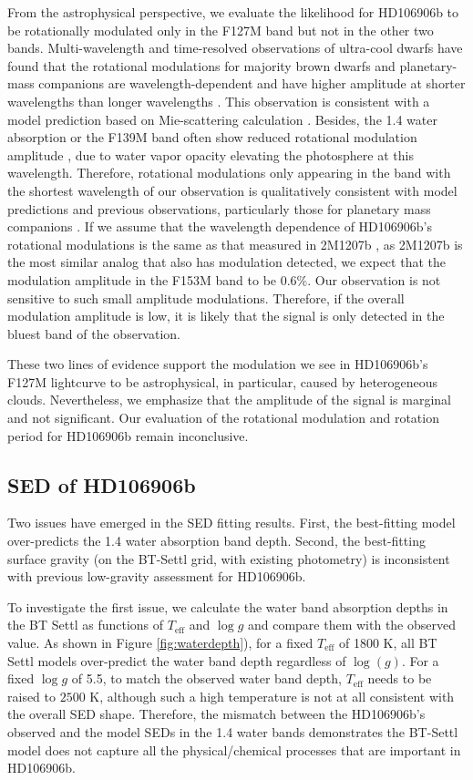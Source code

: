 \documentclass[twocolumn]{aastex62}
\newcommand{\logg}{\ensuremath{\log(g)}\xspace}
\begin{document}
From the astrophysical perspective, we evaluate the likelihood for HD106906b to be rotationally modulated only in the F127M band but not in the other two bands. Multi-wavelength and time-resolved observations of ultra-cool dwarfs have found that the rotational modulations for majority  brown dwarfs and planetary-mass companions are wavelength-dependent and have higher amplitude at shorter wavelengths than longer wavelengths \citep[e.g.,][]{Zhou2019,Zhou2016,Yang2014,Apai2013,Schlawin}. This observation is consistent with a model prediction based on Mie-scattering calculation \citep{Schlawin,Hiranaka2016}. Besides, the 1.4 \micron{} water absorption or the F139M band often show reduced rotational modulation amplitude \citep[e.g.,][]{Apai2013}, due to water vapor opacity elevating the photosphere at this wavelength.  Therefore, rotational modulations only appearing in the band with the shortest wavelength of our observation is qualitatively consistent with model predictions and previous observations, particularly those for planetary mass companions \citep{Zhou2016,Zhou2019}. If we assume that the wavelength dependence of HD106906b's rotational modulations is the same as that measured in 2M1207b \citep{Zhou2016}, as 2M1207b is the most similar analog that also has modulation detected, we expect that the modulation amplitude in the F153M band to be 0.6\%. Our observation is not sensitive to such small amplitude modulations. Therefore, if the overall modulation amplitude is low, it is likely that the signal is only detected in the bluest band of the observation.

These two lines of evidence support the modulation we see in HD106906b's F127M lightcurve to be astrophysical, in particular, caused by heterogeneous clouds. Nevertheless, we emphasize that the amplitude of the signal is marginal and not significant. Our evaluation of the rotational modulation and rotation period for HD106906b remain inconclusive.


\subsection{SED of  HD106906b}
Two issues have emerged in the SED fitting results. First, the best-fitting model over-predicts the 1.4 \micron{} water absorption band depth. Second, the best-fitting surface gravity (on the BT-Settl grid, with existing photometry) is inconsistent with previous low-gravity assessment for HD106906b.

To investigate the first issue, we calculate the water band absorption depths in the BT Settl as functions of $T_{\mathrm{eff}}$ and $\log g$ and compare them with the observed value. As shown in Figure \ref{fig:waterdepth}), for a fixed $T_{\mathrm{eff}}$ of 1800 K, all BT Settl models over-predict the water band depth regardless of \logg. For a fixed $\log g$ of 5.5, to match the observed water band depth, $T_{\mathrm{eff}}$ needs to be raised to $2500$ K, although such a high temperature is not at all consistent with the overall SED shape. Therefore, the mismatch between the HD106906b's observed and the model SEDs in the 1.4 \micron{} water bands demonstrates the BT-Settl model does not capture all the physical/chemical processes that are important in HD106906b.
\end{document}
